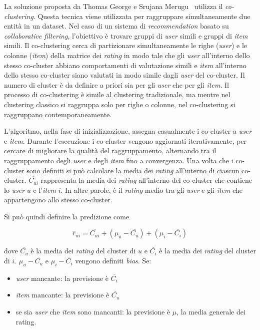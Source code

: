 La soluzione proposta da Thomas George e Srujana Merugu~\cite{Co-Clustering} utilizza il \textit{co-clustering}. Questa tecnica viene utilizzata per raggruppare simultaneamente due entità in un dataset. Nel caso di un sistema di \textit{recommendation} basato su \textit{collaborative filtering}, l'obiettivo è trovare gruppi di \textit{user} simili e gruppi di \textit{item} simili. Il co-clustering cerca di partizionare simultaneamente le righe (\textit{user}) e le colonne (\textit{item}) della matrice dei \textit{rating} in modo tale che gli \textit{user} all'interno dello stesso co-cluster abbiano comportamenti di valutazione simili e \textit{item} all'interno dello stesso co-cluster siano valutati in modo simile dagli \textit{user} del co-cluster. Il numero di cluster è da definire a priori sia per gli \textit{user} che per gli \textit{item}. Il processo di co-clustering è simile al clustering tradizionale, ma mentre nel clustering classico si raggruppa solo per righe o colonne, nel co-clustering si raggruppano contemporaneamente. 

L'algoritmo, nella fase di inizializzazione, assegna casualmente i co-cluster a \textit{user} e \textit{item}. Durante l'esecuzione i co-cluster vengono aggiornati iterativamente, per cercare di migliorare la qualità del raggruppamento, alternando tra il raggruppamento degli \textit{user} e degli \textit{item} fino a convergenza. Una volta che i co-cluster sono definiti si può calcolare la media dei \textit{rating} all'interno di ciascun co-cluster. $ \overline{C_{ui}} $ rappresenta la media dei \textit{rating} all'interno del co-cluster che contiene lo \textit{user} $ u $ e l'\textit{item} $ i $. In altre parole, è il \textit{rating} medio tra gli \textit{user} e gli \textit{item} che appartengono allo stesso co-cluster.

Si può quindi definire la predizione come

\[
\hat{r}_{ui} = \overline{C_{ui}} + (\mu_u - \overline{C_u}) + (\mu_i - \overline{C_i})
\]

dove $\overline{C_u}$ è la media dei \textit{rating} del cluster di $u$ e $\overline{C_i}$ è la media dei \textit{rating} del cluster di $i$. $ \mu_u - \overline{C_u} $ e $ \mu_i - \overline{C_i} $ vengono definiti \textit{bias}. Se: 
\begin{itemize}
  \item \textit{user} mancante: la previsione è $ \overline{C_i} $
  \item \textit{item} mancante: la previsione è $ \overline{C_u} $
  \item se sia \textit{user} che \textit{item} sono mancanti: la previsione è $ \mu $, la media generale dei rating.
\end{itemize}

